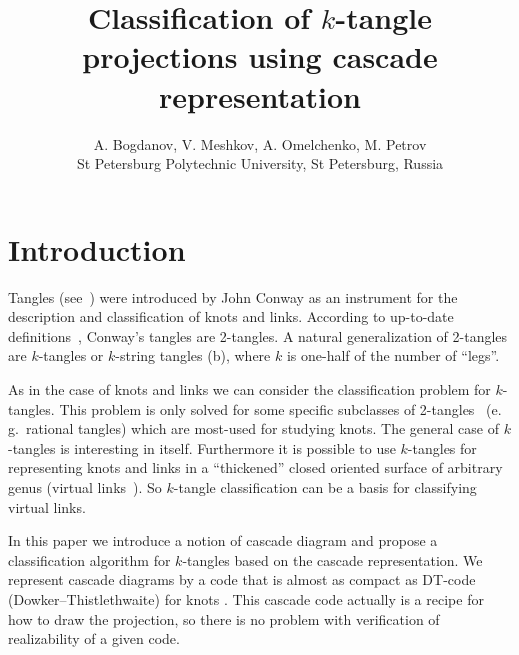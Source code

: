 \documentclass[12pt]{article}
\begin{document}
\title{Classification of $k$-tangle projections using cascade representation}

\author{A. Bogdanov, V. Meshkov, A. Omelchenko, M. Petrov\\
St Petersburg Polytechnic University, St Petersburg, Russia}


\maketitle

\section*{Introduction}

Tangles (see~) were introduced by John Conway \cite{Conway1970} as an
instrument for the description and classification of knots and links. According to up-to-date
definitions~\cite{Cromwell2004}, Conway's tangles are 2-tangles. A natural generalization of
2-tangles are $k$-tangles or $k$-string tangles (b), where $k$ is one-half of
the number of ``legs''.

As in the case of knots and links we can consider the classification problem for %
$k$-tangles. This problem is only solved for some specific subclasses of
2-tangles~\cite{Kanenobu2003,Kauffman2004} (e.\,g.~rational tangles) which are most-used for
studying knots. The general case of $k$-tangles is interesting in itself. Furthermore it is
possible to use $k$-tangles for representing knots and links in a ``thickened'' closed oriented
surface of arbitrary genus (virtual links~\cite{Kauffman1999,Kuperberg2003}). So $k$-tangle
classification can be a basis for classifying virtual links.



In this paper we introduce a notion of cascade diagram and propose a classification algorithm for
$k$-tangles based on the cascade representation. We represent cascade diagrams by a code that is
almost as compact as DT-code (Dowker--Thistlethwaite) for knots \cite{Dowker1983}. This cascade
code actually is a recipe for how to draw the projection, so there is no problem with
verification of realizability of a given code.
\end{document}
